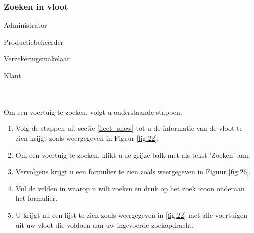 \documentclass[11pt,openany]{article}
\newcommand{\cmark}{\ding{51}}%
\newcommand{\done}{\rlap{$\square$}{\raisebox{2pt}{\large\hspace{1pt}\cmark}}%
	\hspace{-2.5pt}}
\begin{document}
\subsubsection{Zoeken in vloot}
\label{vehicle_search}
\begin{todolist}
	\item[\done] Administrator
	\item[\done] Productiebeheerder
	\item[\done] Verzekeringsmakelaar
	\item[\done] Klant 
\end{todolist}
\\
\\
Om een voertuig te zoeken, volgt u onderstaande stappen:
\begin{enumerate}
		\item Volg de stappen uit sectie \ref{fleet_show} tot u de informatie van de vloot te zien krijgt zoals weergegeven in Figuur \ref{fig:22}.
	\item Om een voertuig te zoeken, klikt u de grijze balk met als tekst 'Zoeken' aan. 
	\item Vervolgens krijgt u een formulier te zien zoals weergegeven in Figuur \ref{fig:26}.
	\item Vul de velden in waarop u wilt zoeken en druk op het zoek icoon onderaan het formulier.
	\item U krijgt nu een lijst te zien zoals weergegeven in \ref{fig:22} met alle voertuigen uit uw vloot die voldoen aan uw ingevoerde zoekopdracht.
\end{enumerate}
\end{document}

